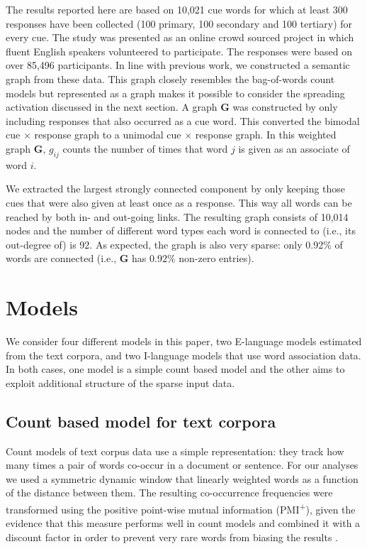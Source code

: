 \documentclass{article}
\begin{document}
The results reported here are based on 10,021 cue words for which at least 300 responses have been collected (100 primary, 100 secondary and 100 tertiary) for every cue. The study was presented as an online crowd sourced project in which fluent English speakers volunteered to participate. The responses were based on over 85,496 participants. In line with previous work, we constructed a semantic graph from these data. This graph closely resembles the bag-of-words count models but represented as a graph makes it possible to consider the spreading activation discussed in the next section. A graph $\mathbf{G}$ was constructed by only including responses that also occurred as a cue word. This converted the bimodal cue $\times$ response graph to a unimodal cue $\times$ response graph. In this weighted graph $\mathbf{G}$,  $g_{ij}$ counts the number of times that word $j$ is given as an associate of word $i$.

We extracted the largest strongly connected component by only keeping those cues that were also given at least once as a response. This way all words can be reached by both in- and out-going links. The resulting graph consists of 10,014 nodes and the number of different word types each word is connected to (i.e., its out-degree of) is 92. As expected, the graph is also very sparse: only 0.92\% of words are connected (i.e., $\mathbf{G}$ has 0.92\% non-zero entries).

\section{Models}
\label{sec:models}

We consider four different models in this paper, two E-language models estimated from the text corpora, and two I-language models that use word association data. In both cases, one model is a simple count based model  and the other aims to exploit additional structure of the sparse input data.


\subsection{Count based model for text corpora}

Count models of text corpus data use a simple representation: they track how many times a pair of words co-occur in a document or sentence. For our analyses we used a symmetric dynamic window that linearly weighted words as a function of the distance between them. The resulting co-occurrence frequencies were transformed using the positive point-wise mutual information (PMI\textsuperscript{+}), given the evidence that this measure performs well in count models and combined it with a discount factor in order to prevent very rare words from biasing the results \cite{LevyGoldberg2015}.
\end{document}
